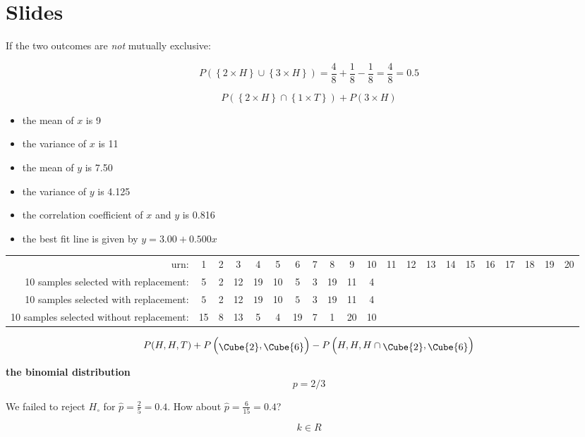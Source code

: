 \documentclass{article}
\begin{document}
\section*{Slides}

If the two outcomes are \emph{not} mutually exclusive:

\[
P\left(\left\{2\times{H}\right\} \cup \left\{3\times{H}\right\}\right)
= \frac{4}{8} + \frac{1}{8} - \frac{1}{8} = \frac{4}{8} = 0.5
\]

\[
P\left(\left\{2\times{H}\right\} \cap \left\{1\times{T}\right\}\right) +
P\left(3 \times{H}\right)
\]

\begin{itemize}
\item the mean of $x$ is 9
\item the variance of $x$ is 11
\item the mean of $y$ is 7.50
\item the variance of $y$ is 4.125
\item the correlation coefficient of $x$ and $y$ is 0.816
\item the best fit line is given by $y = 3.00 + 0.500 x$
\end{itemize}

\begin{tabular}{r|cccccccccccccccccccc}
  urn: & 1 & 2 & 3 & 4 & 5 & 6 & 7 & 8 & 9 & 10 &
  11 & 12 & 13 & 14 & 15 & 16 & 17 & 18 & 19 & 20 \\
  10 samples selected with replacement: &
  5 & 2 & 12 & 19 & 10 & 5 & 3 & 19 & 11 & 4
  & & & & & & & & & & \\
  10 samples selected with replacement: &
  $\boxed{5}$ & 2 & 12 & $\boxed{19}$ & 10 & $\boxed{5}$ & 3 & $\boxed{19}$ & 11 & 4
  & & & & & & & & & & \\
  10 samples selected without replacement: &
  15 & 8 & 13 & 5 & 4 & 19 & 7 & 1 & 20 & 10
  & & & & & & & & & & 
\end{tabular}

\[
P(H,H,T) +
P\left(\raisebox{-2pt}{\Cube{2}},\raisebox{-2pt}{\Cube{6}}\right) -
P\left(H,H,H \cap \raisebox{-2pt}{\Cube{2}},\raisebox{-2pt}{\Cube{6}}\right)
\]

\textbf{the binomial distribution}\\

\[
p = 2/3
\]

We failed to reject $H_\circ$ for $\hat{p}=\frac{2}{5}=0.4$. How about
$\hat{p}=\frac{6}{15}=0.4$?

\[
k \in R
\]
\end{document}
